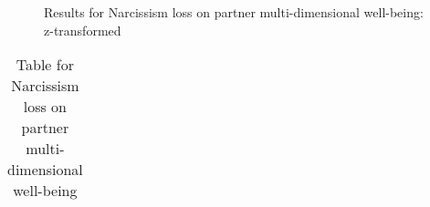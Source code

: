 \documentclass[
  singlecolumn]{article}
\begin{document}
\begin{figure}


\caption{\label{fig-results-narcissism-loss}Results for Narcissism loss
on partner multi-dimensional well-being: z-transformed}

\end{figure}%

\newpage{}

\begin{longtable}[]{@{}
  >{\raggedright\arraybackslash}p{}
  >{\raggedleft\arraybackslash}p{}
  >{\raggedleft\arraybackslash}p{}
  >{\raggedleft\arraybackslash}p{}
  >{\raggedleft\arraybackslash}p{}
  >{\raggedleft\arraybackslash}p{}@{}}

\caption{\label{tbl-results-narcissism-loss}Table for Narcissism loss on
partner multi-dimensional well-being}

\tabularnewline


\end{longtable}
\end{document}
